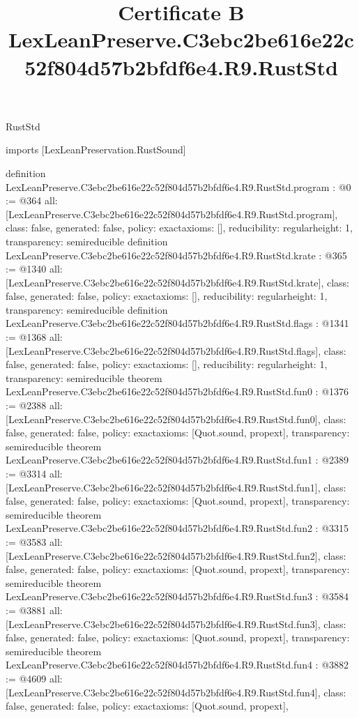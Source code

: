 \begin{lexlean}{RustStd}
\title{Certificate B LexLeanPreserve.C3ebc2be616e22c52f804d57b2bfdf6e4.R9.RustStd}
\begin{coremodule}
imports [LexLeanPreservation.RustSound]

definition LexLeanPreserve.C3ebc2be616e22c52f804d57b2bfdf6e4.R9.RustStd.program : @0 := @364 {
  all: [LexLeanPreserve.C3ebc2be616e22c52f804d57b2bfdf6e4.R9.RustStd.program],
  class: false,
  generated: false,
  policy: exact{axioms: []},
  reducibility: regular{height: 1},
  transparency: semireducible
}
definition LexLeanPreserve.C3ebc2be616e22c52f804d57b2bfdf6e4.R9.RustStd.krate : @365 := @1340 {
  all: [LexLeanPreserve.C3ebc2be616e22c52f804d57b2bfdf6e4.R9.RustStd.krate],
  class: false,
  generated: false,
  policy: exact{axioms: []},
  reducibility: regular{height: 1},
  transparency: semireducible
}
definition LexLeanPreserve.C3ebc2be616e22c52f804d57b2bfdf6e4.R9.RustStd.flags : @1341 := @1368 {
  all: [LexLeanPreserve.C3ebc2be616e22c52f804d57b2bfdf6e4.R9.RustStd.flags],
  class: false,
  generated: false,
  policy: exact{axioms: []},
  reducibility: regular{height: 1},
  transparency: semireducible
}
theorem LexLeanPreserve.C3ebc2be616e22c52f804d57b2bfdf6e4.R9.RustStd.fun0 : @1376 := @2388 {
  all: [LexLeanPreserve.C3ebc2be616e22c52f804d57b2bfdf6e4.R9.RustStd.fun0],
  class: false,
  generated: false,
  policy: exact{axioms: [Quot.sound, propext]},
  transparency: semireducible
}
theorem LexLeanPreserve.C3ebc2be616e22c52f804d57b2bfdf6e4.R9.RustStd.fun1 : @2389 := @3314 {
  all: [LexLeanPreserve.C3ebc2be616e22c52f804d57b2bfdf6e4.R9.RustStd.fun1],
  class: false,
  generated: false,
  policy: exact{axioms: [Quot.sound, propext]},
  transparency: semireducible
}
theorem LexLeanPreserve.C3ebc2be616e22c52f804d57b2bfdf6e4.R9.RustStd.fun2 : @3315 := @3583 {
  all: [LexLeanPreserve.C3ebc2be616e22c52f804d57b2bfdf6e4.R9.RustStd.fun2],
  class: false,
  generated: false,
  policy: exact{axioms: [Quot.sound, propext]},
  transparency: semireducible
}
theorem LexLeanPreserve.C3ebc2be616e22c52f804d57b2bfdf6e4.R9.RustStd.fun3 : @3584 := @3881 {
  all: [LexLeanPreserve.C3ebc2be616e22c52f804d57b2bfdf6e4.R9.RustStd.fun3],
  class: false,
  generated: false,
  policy: exact{axioms: [Quot.sound, propext]},
  transparency: semireducible
}
theorem LexLeanPreserve.C3ebc2be616e22c52f804d57b2bfdf6e4.R9.RustStd.fun4 : @3882 := @4609 {
  all: [LexLeanPreserve.C3ebc2be616e22c52f804d57b2bfdf6e4.R9.RustStd.fun4],
  class: false,
  generated: false,
  policy: exact{axioms: [Quot.sound, propext]},
}
\end{coremodule}
\end{lexlean}
